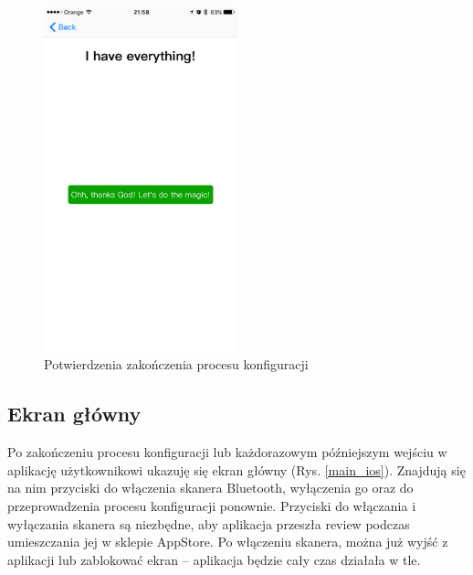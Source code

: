 \documentclass[a4paper,11pt]{article}
\begin{document}
\begin{enumerate}
\begin{figure}[H]
	\includegraphics[width=0.5\textwidth,center]{ios-screens/setup7.png}
	\caption {Potwierdzenia zakończenia procesu konfiguracji}
	\label{setup7}
\end{figure}

\end{enumerate}

\newpage
\subsection{Ekran główny}
Po zakończeniu procesu konfiguracji lub każdorazowym późniejszym wejściu w aplikację użytkownikowi ukazuję się ekran główny (Rys. \ref{main_ios}). Znajdują się na nim przyciski do włączenia skanera Bluetooth, wyłączenia go oraz do przeprowadzenia procesu konfiguracji ponownie. Przyciski do włączania i wyłączania skanera są niezbędne, aby aplikacja przeszła review podczas umieszczania jej w sklepie AppStore. Po włączeniu skanera, można już wyjść z aplikacji lub zablokować ekran -- aplikacja będzie cały czas działała w tle.
\end{document}
